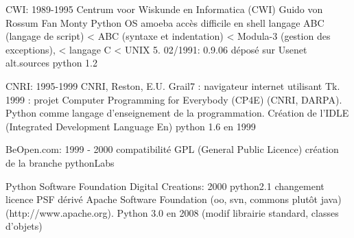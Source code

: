
CWI: 1989-1995 
Centrum voor Wiskunde en Informatica (CWI)
Guido von Rossum Fan Monty Python
OS amoeba accès difficile en shell
langage ABC (langage de script)
< ABC (syntaxe et indentation)
< Modula-3 (gestion des exceptions), 
< langage C 
< UNIX 5.
02/1991: 0.9.06 déposé sur Usenet alt.sources
python 1.2

CNRI: 1995-1999
CNRI, Reston, E.U.
Grail7 : navigateur internet utilisant Tk. 
1999 : projet Computer Programming for Everybody (CP4E) (CNRI, DARPA). 
Python comme langage d'enseignement de la programmation. 
Création de l'IDLE (Integrated Development Language En)
python 1.6 en 1999

BeOpen.com: 1999 - 2000
compatibilité GPL (General Public Licence)
création de la branche pythonLabs

Python Software Foundation Digital Creations: 2000
python2.1 changement licence PSF dérivé Apache Software Foundation (oo, svn, commons plutôt java) (http://www.apache.org). 
Python 3.0 en 2008 (modif librairie standard, classes d'objets)

